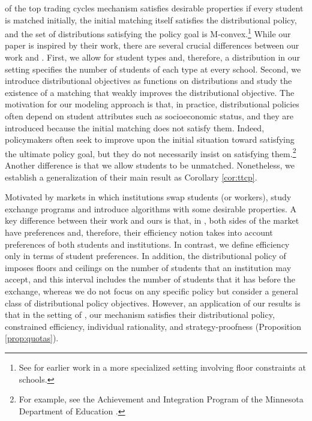 \documentclass[12pt]{amsart}
\theoremstyle{remark}
\newcommand{\ieh}[1]{{\color{orange} IEH: #1 }}
\newcommand{\mby}[1]{{\color{blue} MBY: #1 }}
\begin{document}
of the top trading cycles mechanism satisfies desirable properties if every student is matched initially, the initial matching itself
satisfies the distributional policy, and the set of distributions satisfying the policy goal is M-convex.\footnote{See \citet{kurata2016pareto}
for earlier work in a more specialized setting involving floor constraints at schools.}
While our paper is inspired by their work, there are several crucial differences between our work and \citet{suzuki17}.
First, we allow for student types and, therefore, a distribution in our setting specifies the number of students of each type at every school.
Second, we introduce distributional objectives as functions on distributions and study the existence of
a matching that weakly improves the distributional objective. The motivation for our modeling approach is that, in practice, distributional policies often depend on student attributes
such as socioeconomic status, and they are introduced because the initial matching does not satisfy them. Indeed, policymakers often seek to improve upon the initial situation
toward satisfying the ultimate policy goal, but they do not necessarily insist on satisfying them.\footnote{For example, see the Achievement and Integration Program of the Minnesota Department of Education \citep{hafalir2022interdistrict}.} Another difference is that we allow students to be unmatched.
Nonetheless, we establish a generalization of their main result as Corollary \ref{cor:ttcp}.

Motivated by markets in which institutions swap students (or workers), \cite{dur2015two} study exchange programs and introduce %
algorithms with some desirable properties. A key difference between their work and ours is that, in \cite{dur2015two}, both sides of the market have preferences
and, therefore, their efficiency notion takes into account preferences of both students and institutions. In contrast, we define efficiency only in terms of student preferences.
In addition, the distributional policy of \cite{dur2015two} imposes floors and ceilings on the number of students that an institution may accept,
and this interval includes the number of students that it has before the exchange, whereas we do not focus on any specific policy but consider a general class of
distributional policy objectives. %
However, an application of our results is that in the setting of \cite{dur2015two}, our mechanism satisfies their distributional policy, constrained efficiency, individual rationality,
and strategy-proofness (Proposition \ref{prop:quotas}).
\end{document}
